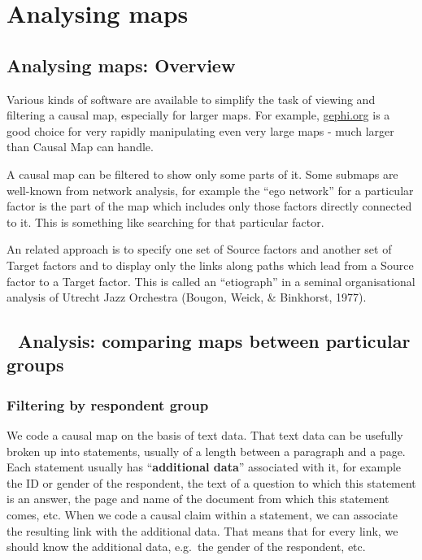\documentclass[
]{book}
\begin{document}
\hypertarget{part-analysing-maps}{%
\part{Analysing maps}\label{part-analysing-maps}}

\hypertarget{analysing-maps-overview}{%
\chapter{Analysing maps: Overview}\label{analysing-maps-overview}}

Various kinds of software are available to simplify the task of viewing and filtering a causal map, especially for larger maps. For example, \href{http://gephi.org}{gephi.org} is a good choice for very rapidly manipulating even very large maps - much larger than Causal Map can handle.

A causal map can be filtered to show only some parts of it. Some submaps are well-known from network analysis, for example the ``ego network'' for a particular factor is the part of the map which includes only those factors directly connected to it. This is something like searching for that particular factor.

An related approach is to specify one set of Source factors and another set of Target factors and to display only the links along paths which lead from a Source factor to a Target factor. This is called an ``etiograph'' in a seminal organisational analysis of Utrecht Jazz Orchestra (Bougon, Weick, \& Binkhorst, 1977).

\hypertarget{comparing}{%
\chapter{🧠 Analysis: comparing maps between particular groups}\label{comparing}}

\hypertarget{filtering-by-respondent-group}{%
\section{Filtering by respondent group}\label{filtering-by-respondent-group}}

We code a causal map on the basis of text data. That text data can be usefully broken up into statements, usually of a length between a paragraph and a page. Each statement usually has ``\textbf{additional data}'' associated with it, for example the ID or gender of the respondent, the text of a question to which this statement is an answer, the page and name of the document from which this statement comes, etc. When we code a causal claim within a statement, we can associate the resulting link with the additional data. That means that for every link, we should know the additional data, e.g.~the gender of the respondent, etc.
\end{document}
